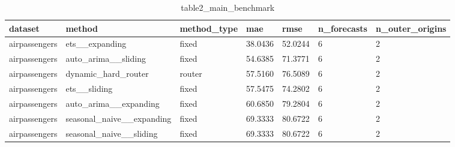 \begin{table}[t]
\centering
\begin{tabular}{lllllll}
\hline
dataset & method & method\_type & mae & rmse & n\_forecasts & n\_outer\_origins \\
\hline
airpassengers & ets\_\_expanding & fixed & 38.0436 & 52.0244 & 6 & 2 \\
airpassengers & auto\_arima\_\_sliding & fixed & 54.6385 & 71.3771 & 6 & 2 \\
airpassengers & dynamic\_hard\_router & router & 57.5160 & 76.5089 & 6 & 2 \\
airpassengers & ets\_\_sliding & fixed & 57.5475 & 74.2802 & 6 & 2 \\
airpassengers & auto\_arima\_\_expanding & fixed & 60.6850 & 79.2804 & 6 & 2 \\
airpassengers & seasonal\_naive\_\_expanding & fixed & 69.3333 & 80.6722 & 6 & 2 \\
airpassengers & seasonal\_naive\_\_sliding & fixed & 69.3333 & 80.6722 & 6 & 2 \\
\hline
\end{tabular}
\caption{table2\_main\_benchmark}
\end{table}
